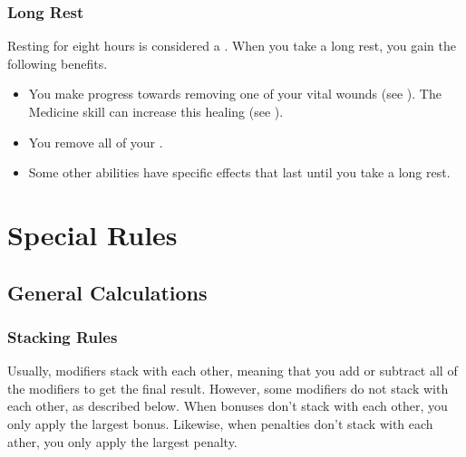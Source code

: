         \subsubsection{Long Rest}\label{Long Rest}
            Resting for eight hours is considered a .
            When you take a long rest, you gain the following benefits.
            \begin{itemize}
                \item You make progress towards removing one of your vital wounds (see ).
                    The Medicine skill can increase this healing (see ).
                \item You remove all of your .
                \item Some other abilities have specific effects that last until you take a long rest.
            \end{itemize}

\section{Special Rules}

    \subsection{General Calculations}

        \subsubsection{Stacking Rules}\label{Stacking Rules}
            Usually, modifiers stack with each other, meaning that you add or subtract all of the modifiers to get the final result.
            However, some modifiers do not stack with each other, as described below.
            When bonuses don't stack with each other, you only apply the largest bonus.
            Likewise, when penalties don't stack with each ather, you only apply the largest penalty.


